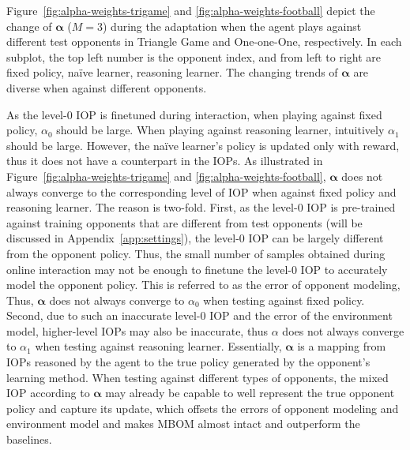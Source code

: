 \documentclass{article}
\begin{document}
Figure~\ref{fig:alpha-weights-trigame} and \ref{fig:alpha-weights-football} depict the change of $\bm{\alpha}$ ($M=3$) during the adaptation when the agent plays against different test opponents in Triangle Game and One-one-One, respectively. In each subplot, the top left number is the opponent index, and from left to right are fixed policy, na\"ive learner, reasoning learner. The changing trends of $\bm{\alpha}$ are diverse when against different opponents. 

As the level-0 IOP is finetuned during interaction, when playing against fixed policy, $\alpha_0$ should be large. When playing against reasoning learner, intuitively $\alpha_1$ should be large. However, the na\"ive learner's policy is updated only with reward, thus it does not have a counterpart in the IOPs. As illustrated in Figure~\ref{fig:alpha-weights-trigame} and \ref{fig:alpha-weights-football}, $\bm{\alpha}$ does not always converge to the corresponding level of IOP when against fixed policy and reasoning learner. The reason is two-fold. First, as the level-0 IOP is pre-trained against training opponents that are different from test opponents (will be discussed in Appendix~\ref{app:settings}), the level-0 IOP can be largely different from the opponent policy. Thus, the small number of samples obtained during online interaction may not be enough to finetune the level-0 IOP to accurately model the opponent policy. This is referred to as the error of opponent modeling, Thus, $\bm{\alpha}$ does not always converge to $\alpha_0$ when testing against fixed policy. Second, due to such an inaccurate level-0 IOP and the error of the environment model, higher-level IOPs may also be inaccurate, thus $\alpha$ does not always converge to $\alpha_1$ when testing against reasoning learner. Essentially, $\bm{\alpha}$ is a mapping from IOPs reasoned by the agent to the true policy generated by the opponent's learning method. When testing against different types of opponents, the mixed IOP according to $\bm{\alpha}$ may already be capable to well represent the true opponent policy and capture its update, which offsets the errors of opponent modeling and environment model and makes MBOM almost intact and outperform the baselines. 
\end{document}
